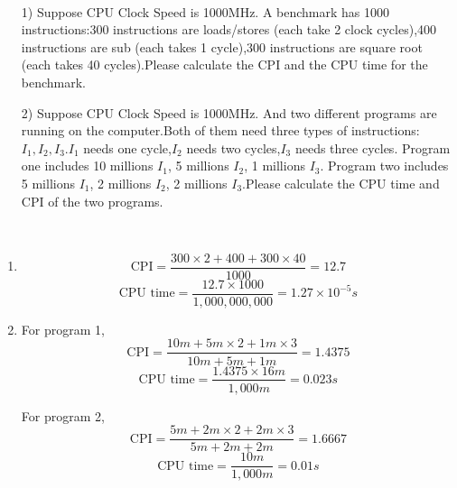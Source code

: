 \begin{exercise}[]{
    \par{~}
\begin{itemize}
    \item [1)] 
    Suppose CPU Clock Speed is 1000MHz. A benchmark has 1000 instructions:300 instructions are loads/stores (each take 2 clock cycles),400 instructions are sub (each takes 1 cycle),300 instructions are square root (each takes 40 cycles).Please calculate the CPI and the CPU time for the benchmark.
    \item [2)]
    Suppose CPU Clock Speed is 1000MHz. And two different programs are running on the computer.Both of them need three types of instructions:$I_1,I_2,I_3$.$I_1$ needs one cycle,$I_2$ needs two cycles,$I_3$ needs three cycles. Program one includes 10 millions $I_1$, 5 millions $I_2$, 1 millions $I_3$. Program two includes 5 millions $I_1$, 2 millions $I_2$, 2 millions $I_3$.Please calculate the CPU time and CPI of the two programs.
\end{itemize}}
  \begin{solution}
  \par{~}
  \begin{enumerate}
      \item {
          \begin{equation}
              \text{CPI} = \frac{300 \times 2 + 400 + 300 \times 40}{1000} = 12.7
          \end{equation}
          \begin{equation}
              \text{CPU time} = \frac{12.7 \times 1000}{1,000,000,000} = 1.27 \times 10^{-5} s
          \end{equation}
      }
      \item {
          For program 1, 
          \begin{equation}
            \text{CPI} = \frac{10m + 5m \times 2 + 1m \times 3}{10m+5m+1m} = 1.4375
        \end{equation}
        \begin{equation}
            \text{CPU time} = \frac{1.4375 \times 16m}{1,000 m} = 0.023 s
        \end{equation}

        For program 2, 
          \begin{equation}
            \text{CPI} = \frac{5m + 2m \times 2 + 2m \times 3}{5m+2m+2m} = 1.6667
        \end{equation}
        \begin{equation}
            \text{CPU time} = \frac{10m}{1,000 m} = 0.01 s
        \end{equation}
      }
  \end{enumerate}


  \end{solution}
  \label{ex3}
\end{exercise}


